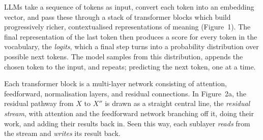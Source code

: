 \documentclass[11pt]{article}
\begin{document}
LLMs take a sequence of tokens as input, convert each token into an embedding vector, and pass these through a stack of transformer blocks which build progressively richer, contextualised representations of meaning (Figure~1). The final representation of the last token then produces a score for every token in the vocabulary, the \emph{logits}, which a final step turns into a probability distribution over possible next tokens. The model samples from this distribution, appends the chosen token to the input, and repeats; predicting the next token, one at a time.

Each transformer block is a multi-layer network consisting of attention, feedforward, normalisation layers, and residual connections. In Figure~2a, the residual pathway from $X$ to $X''$ is drawn as a straight central line, the \textit{residual stream}, with attention and the feedforward network branching off it, doing their work, and adding their results back in. Seen this way, each sublayer \emph{reads} from the stream and \emph{writes} its result back.
\end{document}

